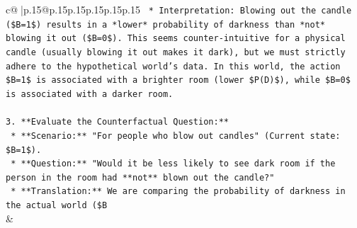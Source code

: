 \documentclass{article}
\begin{document}
{\begin{supertabular}{c@{$\;$}|p{.15\linewidth}@{}p{.15\linewidth}p{.15\linewidth}p{.15\linewidth}p{.15\linewidth}p{.15\linewidth}}
{{{\texttt{    *   Interpretation: Blowing out the candle (\$B=1\$) results in a *lower* probability of darkness than *not* blowing it out (\$B=0\$). This seems counter{-}intuitive for a physical candle (usually blowing it out makes it dark), but we must strictly adhere to the hypothetical world's data. In this world, the action \$B=1\$ is associated with a brighter room (lower \$P(D)\$), while \$B=0\$ is associated with a darker room.} \\
\\ 
\texttt{3.  **Evaluate the Counterfactual Question:**} \\
\texttt{    *   **Scenario:** "For people who blow out candles" (Current state: \$B=1\$).} \\
\texttt{    *   **Question:** "Would it be less likely to see dark room if the person in the room had **not** blown out the candle?"} \\
\texttt{    *   **Translation:** We are comparing the probability of darkness in the actual world (\$B} \\
            }
        }
    }
    & \\ \\


\end{supertabular}}
\end{document}
